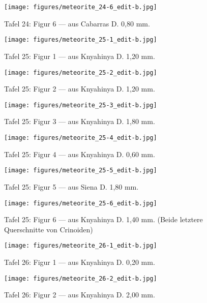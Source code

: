 \documentclass[a4paper, 11pt, oneside]{article}
\begin{document}
\clearpage
\begin{figure}[t]
\texttt{[image: figures/meteorite\_24-6\_edit-b.jpg]}
\caption{Tafel 24: Figur 6 --- aus Cabarras D. 0,80 mm.}
\centering
\end{figure}
\clearpage
{}
\begin{figure}[t]
\texttt{[image: figures/meteorite\_25-1\_edit-b.jpg]}
\caption{Tafel 25: Figur 1 --- aus Knyahinya D. 1,20 mm.}
\centering
\end{figure}
\clearpage
\begin{figure}[t]
\texttt{[image: figures/meteorite\_25-2\_edit-b.jpg]}
\caption{Tafel 25: Figur 2 --- aus Knyahinya D. 1,20 mm.}
\centering
\end{figure}
\clearpage
\begin{figure}[t]
\texttt{[image: figures/meteorite\_25-3\_edit-b.jpg]}
\caption{Tafel 25: Figur 3 --- aus Knyahinya D. 1,80 mm.}
\centering
\end{figure}
\clearpage
\begin{figure}[t]
\texttt{[image: figures/meteorite\_25-4\_edit-b.jpg]}
\caption{Tafel 25: Figur 4 --- aus Knyahinya D. 0,60 mm.}
\centering
\end{figure}
\clearpage
\begin{figure}[t]
\texttt{[image: figures/meteorite\_25-5\_edit-b.jpg]}
\caption{Tafel 25: Figur 5 --- aus Siena D. 1,80 mm.}
\centering
\end{figure}
\clearpage
\begin{figure}[t]
\texttt{[image: figures/meteorite\_25-6\_edit-b.jpg]}
\caption{Tafel 25: Figur 6 --- aus Knyahinya D. 1,40 mm. (Beide letztere Querschnitte von Crinoiden)}
\centering
\end{figure}
\clearpage
{}
\begin{figure}[t]
\texttt{[image: figures/meteorite\_26-1\_edit-b.jpg]}
\caption{Tafel 26: Figur 1 --- aus Knyahinya D. 0,20 mm.}
\centering
\end{figure}
\clearpage
\begin{figure}[t]
\texttt{[image: figures/meteorite\_26-2\_edit-b.jpg]}
\caption{Tafel 26: Figur 2 --- aus Knyahinya D. 2,00 mm.}
\centering
\end{figure}
\end{document}
